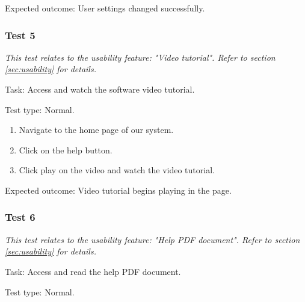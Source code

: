 {\sffamily Expected outcome:} User settings changed successfully. \\

{\color{gray} \hrulefill}

\vspace{0.2cm}

\subsubsection{Test 5}

\textit{This test relates to the usability feature:
"Video tutorial". Refer to section
\ref{sec:usability} for details.} \\ \vspace{0.2cm}

{\sffamily Task:} Access and watch the software video tutorial.\\

{\color{gray} \hrulefill}

{\sffamily Test type: Normal.}\\

\begin{enumerate}
  \item Navigate to the home page of our system.
  \item Click on the help button.
  \item Click play on the video and watch the video tutorial.
\end{enumerate}

{\sffamily Expected outcome:} Video tutorial begins playing in 
the page.

{\color{gray} \hrulefill}

\vspace{0.2cm}

\subsubsection{Test 6}

\textit{This test relates to the usability feature:
"Help PDF document". Refer to section
\ref{sec:usability} for details.} \\ \vspace{0.2cm}

{\sffamily Task:} Access and read the help PDF document.\\ 

{\color{gray} \hrulefill}

{\sffamily Test type: Normal.}\\

